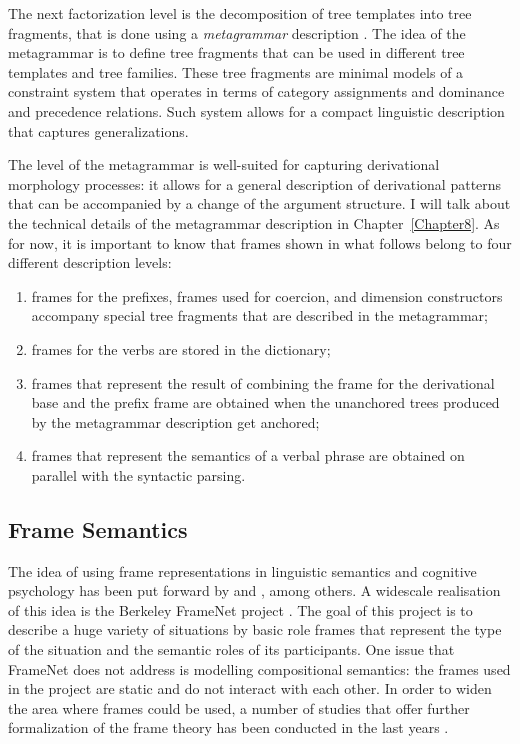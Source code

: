 The next factorization level is the decomposition of tree templates into tree fragments, that is done using a \textit{metagrammar} description \citep{Candito:99, CrabbeDuchier:04, Crabbe:13}. The idea of the metagrammar is to define tree fragments that can be used in different tree templates and tree families. These tree fragments are minimal models of a constraint system that operates in terms of category assignments and dominance and precedence relations. Such system allows for a compact linguistic description that captures generalizations. 

The level of the metagrammar is well-suited for capturing derivational morphology processes: it allows for a general description of derivational patterns that can be accompanied by a change of the argument structure. I will talk about the technical details of the metagrammar description in Chapter~\ref{Chapter8}. As for now, it is important to know that frames shown in what follows belong to four different description levels: 
\begin{enumerate}
\item frames for the prefixes, frames used for coercion, and dimension constructors accompany special tree fragments that are described in the metagrammar; 
\item frames for the verbs are stored in the dictionary; 
\item frames that represent the result of combining the frame for the derivational base and the prefix frame are obtained when the unanchored trees produced by the metagrammar description get anchored; 
\item frames that represent the semantics of a verbal phrase are obtained on parallel with the syntactic parsing.
\end{enumerate}

\subsection{Frame Semantics}
The idea of using frame representations in linguistic semantics and cognitive
psychology has been put forward by \citet{Fillmore:82} and
\citet{Barsalou:92}, among others. A widescale realisation of this idea is the Berkeley FrameNet project \citep{Fillmore:03}. The goal of this project is to describe a huge variety of situations by basic role frames that represent the type of the situation and the semantic roles of its participants. One issue that FrameNet does not address is modelling compositional semantics: the frames used in the project are static and do not interact with each other. In order to widen the area where frames could be used, a number of studies that offer further formalization of the frame theory has been conducted in the last years \citep[][among others]{Petersen:07, PetersenOsswald:10, KallmeyerOsswald:12, KallmeyerOsswald:13, KallmeyerOsswaldPogodalla:15, Loebner:2014}.

